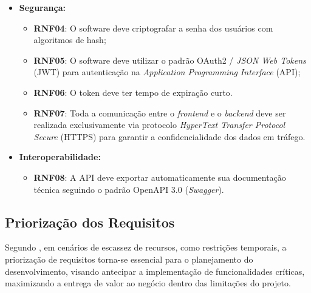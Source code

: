 \begin{itemize}

\item \textbf{Segurança:}

\begin{itemize}

\item \textbf{RNF04}: O software deve criptografar a senha dos usuários com algoritmos de hash;

\item \textbf{RNF05}: O software deve utilizar o padrão OAuth2 / \textit{JSON Web Tokens} (JWT) para autenticação na \textit{Application Programming Interface} (API);

\item \textbf{RNF06}: O token deve ter tempo de expiração curto.

\item \textbf{RNF07}: Toda a comunicação entre o \textit{frontend} e o \textit{backend} deve ser realizada exclusivamente via protocolo \textit{HyperText Transfer Protocol Secure} (HTTPS) para garantir a confidencialidade dos dados em tráfego.

\end{itemize}

\end{itemize}

\begin{itemize}

\item \textbf{Interoperabilidade:}

\begin{itemize}

\item \textbf{RNF08}: A API deve exportar automaticamente sua documentação técnica seguindo o padrão OpenAPI 3.0 (\textit{Swagger}).
\end{itemize}

\end{itemize}


\subsection[Priorização dos Requisitos]{Priorização dos Requisitos}
\label{priorizacao-requisitos}

Segundo , em cenários de escassez de recursos, como restrições temporais, a priorização de requisitos torna-se essencial para o planejamento do desenvolvimento, visando antecipar a implementação de funcionalidades críticas, maximizando a entrega de valor ao negócio dentro das limitações do projeto. 

